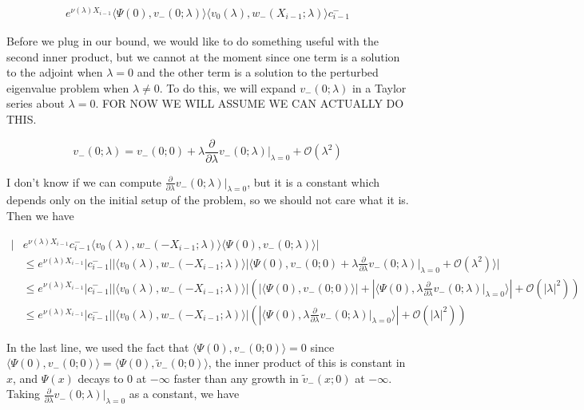 \documentclass[12pt]{article}
\begin{document}
\begin{enumerate}
\begin{align*}
e^{\nu(\lambda)X_{i-1}} \langle \Psi(0), v_-(0; \lambda) \rangle \langle v_0(\lambda), w_-(X_{i-1}; \lambda) \rangle c_{i-1}^-
\end{align*}

Before we plug in our bound, we would like to do something useful with the second inner product, but we cannot at the moment since one term is a solution to the adjoint when $\lambda = 0$ and the other term is a solution to the perturbed eigenvalue problem when $\lambda \neq 0$. To do this, we will expand $v_-(0; \lambda)$ in a Taylor series about $\lambda = 0$. FOR NOW WE WILL ASSUME WE CAN ACTUALLY DO THIS.

\[
v_-(0; \lambda) = v_-(0; 0) + \lambda \frac{\partial}{\partial \lambda}v_-(0; \lambda)\Big|_{\lambda = 0} + \mathcal{O}(\lambda^2)
\]

I don't know if we can compute $\frac{\partial}{\partial \lambda}v_-(0; \lambda)\Big|_{\lambda = 0}$, but it is a constant which depends only on the initial setup of the problem, so we should not care what it is. Then we have

\begin{align*}
|&e^{\nu(\lambda)X_{i-1}} c_{i-1}^- \langle v_0(\lambda), w_-(-X_{i-1}; \lambda) \rangle \langle \Psi(0), v_-(0; \lambda) \rangle|\\
&\leq e^{\nu(\lambda)X_{i-1}}|c_{i-1}^-| |\langle v_0(\lambda), w_-(-X_{i-1}; \lambda) \rangle|\langle \Psi(0), v_-(0; 0) + \lambda \frac{\partial}{\partial \lambda}v_-(0; \lambda)\Big|_{\lambda = 0} + \mathcal{O}(\lambda^2) \rangle| \\
&\leq e^{\nu(\lambda)X_{i-1}}|c_{i-1}^-| |\langle v_0(\lambda), w_-(-X_{i-1}; \lambda) \rangle| \left( |\langle \Psi(0), v_-(0; 0) \rangle| +  |\langle \Psi(0), \lambda \frac{\partial}{\partial \lambda}v_-(0; \lambda)\Big|_{\lambda = 0} \rangle| + \mathcal{O}(|\lambda|^2) \right) \\
&\leq e^{\nu(\lambda)X_{i-1}}|c_{i-1}^-| |\langle v_0(\lambda), w_-(-X_{i-1}; \lambda) \rangle| \left( |\langle \Psi(0), \lambda \frac{\partial}{\partial \lambda}v_-(0; \lambda)\Big|_{\lambda = 0} \rangle| + \mathcal{O}(|\lambda|^2) \right)
\end{align*}

In the last line, we used the fact that $\langle \Psi(0), v_-(0; 0) \rangle = 0$ since $\langle \Psi(0), v_-(0; 0) \rangle = \langle \Psi(0), \tilde{v}_-(0; 0) \rangle$, the inner product of this is constant in $x$, and $\Psi(x)$ decays to 0 at $-\infty$ faster than any growth in $\tilde{v}_-(x; 0)$ at $-\infty$. Taking $\frac{\partial}{\partial \lambda}v_-(0; \lambda)\Big|_{\lambda = 0}$ as a constant, we have


\end{enumerate}
\end{document}
